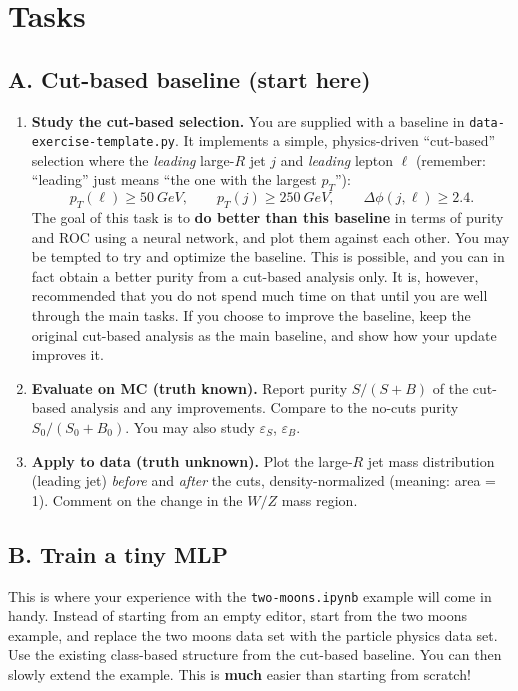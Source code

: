 \documentclass[11pt]{article}
\begin{document}
\section*{Tasks}

\subsection*{A. Cut-based baseline (start here)}
\begin{enumerate}[label=\textbf{A\arabic*.}]
  \item \textbf{Study the cut-based selection.} You are supplied with a baseline in \texttt{data-exercise-template.py}. It implements a simple, physics-driven ``cut-based'' selection where the \emph{leading} large-$R$ jet $j$ and \emph{leading} lepton $\ell$ (remember: ``leading'' just means ``the one with the largest $p_T$''):
  \[
    p_T(\ell) \ge \SI{50}{GeV},\qquad p_T(j) \ge \SI{250}{GeV},\qquad \Delta\phi(j,\ell) \ge 2.4.
  \]
  The goal of this task is to \textbf{do better than this baseline} in terms of purity and ROC using a neural network, and plot them against each other.
  You may be tempted to try and optimize the baseline. This is possible, and you can in fact obtain a better purity from a cut-based analysis only. It is, however, recommended that you do not spend much time on that until you are well through the main tasks. If you choose to improve the baseline, keep the original cut-based analysis as the main baseline, and show how your update improves it.
  \item \textbf{Evaluate on MC (truth known).} Report purity $S/(S{+}B)$ of the cut-based analysis and any improvements. Compare to the no-cuts purity $S_0/(S_0 + B_0)$. You may also study $\varepsilon_S$, $\varepsilon_B$.
  \item \textbf{Apply to data (truth unknown).} Plot the large-$R$ jet mass distribution (leading jet) \emph{before} and \emph{after} the cuts, density-normalized (meaning: area = 1). Comment on the change in the $W/Z$ mass region.
\end{enumerate}

\subsection*{B. Train a tiny MLP}
This is where your experience with the \texttt{two-moons.ipynb} example will come in handy. Instead of starting from an empty editor, start from the two moons example, and replace the two moons data set with the particle physics data set. Use the existing class-based structure from the cut-based baseline. You can then slowly extend the example. This is \textbf{much} easier than starting from scratch!
\end{document}
